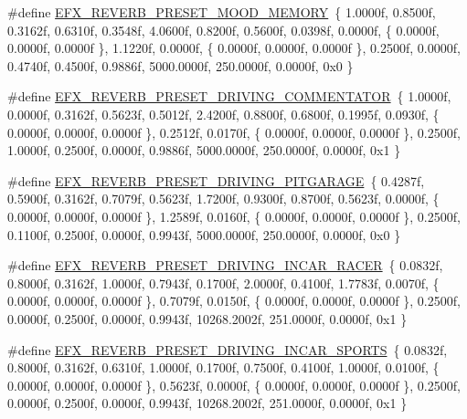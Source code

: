 \begin{DoxyCompactItemize}
\item 
\#define \mbox{\hyperlink{efx-presets_8h_a1ba43992b2442a1acc119886f320cdaa}{E\+F\+X\+\_\+\+R\+E\+V\+E\+R\+B\+\_\+\+P\+R\+E\+S\+E\+T\+\_\+\+M\+O\+O\+D\+\_\+\+M\+E\+M\+O\+RY}}~\{ 1.\+0000f, 0.\+8500f, 0.\+3162f, 0.\+6310f, 0.\+3548f, 4.\+0600f, 0.\+8200f, 0.\+5600f, 0.\+0398f, 0.\+0000f, \{ 0.\+0000f, 0.\+0000f, 0.\+0000f \}, 1.\+1220f, 0.\+0000f, \{ 0.\+0000f, 0.\+0000f, 0.\+0000f \}, 0.\+2500f, 0.\+0000f, 0.\+4740f, 0.\+4500f, 0.\+9886f, 5000.\+0000f, 250.\+0000f, 0.\+0000f, 0x0 \}
\item 
\#define \mbox{\hyperlink{efx-presets_8h_a77cd5d3ce31ec580e5b77b3fa69cc79a}{E\+F\+X\+\_\+\+R\+E\+V\+E\+R\+B\+\_\+\+P\+R\+E\+S\+E\+T\+\_\+\+D\+R\+I\+V\+I\+N\+G\+\_\+\+C\+O\+M\+M\+E\+N\+T\+A\+T\+OR}}~\{ 1.\+0000f, 0.\+0000f, 0.\+3162f, 0.\+5623f, 0.\+5012f, 2.\+4200f, 0.\+8800f, 0.\+6800f, 0.\+1995f, 0.\+0930f, \{ 0.\+0000f, 0.\+0000f, 0.\+0000f \}, 0.\+2512f, 0.\+0170f, \{ 0.\+0000f, 0.\+0000f, 0.\+0000f \}, 0.\+2500f, 1.\+0000f, 0.\+2500f, 0.\+0000f, 0.\+9886f, 5000.\+0000f, 250.\+0000f, 0.\+0000f, 0x1 \}
\item 
\#define \mbox{\hyperlink{efx-presets_8h_a444a33cea9eb540432f42b5d4b0486a8}{E\+F\+X\+\_\+\+R\+E\+V\+E\+R\+B\+\_\+\+P\+R\+E\+S\+E\+T\+\_\+\+D\+R\+I\+V\+I\+N\+G\+\_\+\+P\+I\+T\+G\+A\+R\+A\+GE}}~\{ 0.\+4287f, 0.\+5900f, 0.\+3162f, 0.\+7079f, 0.\+5623f, 1.\+7200f, 0.\+9300f, 0.\+8700f, 0.\+5623f, 0.\+0000f, \{ 0.\+0000f, 0.\+0000f, 0.\+0000f \}, 1.\+2589f, 0.\+0160f, \{ 0.\+0000f, 0.\+0000f, 0.\+0000f \}, 0.\+2500f, 0.\+1100f, 0.\+2500f, 0.\+0000f, 0.\+9943f, 5000.\+0000f, 250.\+0000f, 0.\+0000f, 0x0 \}
\item 
\#define \mbox{\hyperlink{efx-presets_8h_a2c7d0be0205e92c225e1c5cd96425ef1}{E\+F\+X\+\_\+\+R\+E\+V\+E\+R\+B\+\_\+\+P\+R\+E\+S\+E\+T\+\_\+\+D\+R\+I\+V\+I\+N\+G\+\_\+\+I\+N\+C\+A\+R\+\_\+\+R\+A\+C\+ER}}~\{ 0.\+0832f, 0.\+8000f, 0.\+3162f, 1.\+0000f, 0.\+7943f, 0.\+1700f, 2.\+0000f, 0.\+4100f, 1.\+7783f, 0.\+0070f, \{ 0.\+0000f, 0.\+0000f, 0.\+0000f \}, 0.\+7079f, 0.\+0150f, \{ 0.\+0000f, 0.\+0000f, 0.\+0000f \}, 0.\+2500f, 0.\+0000f, 0.\+2500f, 0.\+0000f, 0.\+9943f, 10268.\+2002f, 251.\+0000f, 0.\+0000f, 0x1 \}
\item 
\#define \mbox{\hyperlink{efx-presets_8h_aa42380cee817f0f23be5f9a103f9a723}{E\+F\+X\+\_\+\+R\+E\+V\+E\+R\+B\+\_\+\+P\+R\+E\+S\+E\+T\+\_\+\+D\+R\+I\+V\+I\+N\+G\+\_\+\+I\+N\+C\+A\+R\+\_\+\+S\+P\+O\+R\+TS}}~\{ 0.\+0832f, 0.\+8000f, 0.\+3162f, 0.\+6310f, 1.\+0000f, 0.\+1700f, 0.\+7500f, 0.\+4100f, 1.\+0000f, 0.\+0100f, \{ 0.\+0000f, 0.\+0000f, 0.\+0000f \}, 0.\+5623f, 0.\+0000f, \{ 0.\+0000f, 0.\+0000f, 0.\+0000f \}, 0.\+2500f, 0.\+0000f, 0.\+2500f, 0.\+0000f, 0.\+9943f, 10268.\+2002f, 251.\+0000f, 0.\+0000f, 0x1 \}

\end{DoxyCompactItemize}
